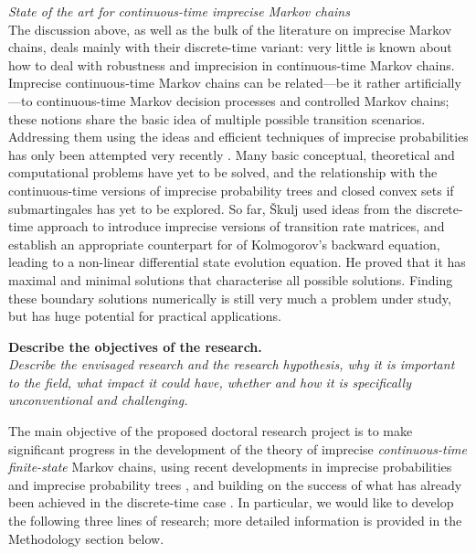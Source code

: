 \documentclass[11pt,dvipsnames,usenames,a4paper]{article}
\begin{document}
\emph{State of the art for continuous-time imprecise Markov chains}\\[5pt]
The discussion above, as well as the bulk of the literature on imprecise Markov chains, deals mainly with their discrete-time variant: very little is known about how to deal with robustness and imprecision in continuous-time Markov chains. 
Imprecise continuous-time Markov chains can be related---be it rather artificially---to continuous-time Markov decision processes and controlled Markov chains; these notions share the basic idea of multiple possible transition scenarios.
Addressing them using the ideas and efficient techniques of imprecise probabilities has only been attempted very recently \cite{skulj2015:continuous:bounds,Troffaes+GSB-ISIPTA15p,DeBock:2016:iCTMClimit}.
Many basic conceptual, theoretical and computational problems have yet to be solved, and the relationship with the continuous-time versions of imprecise probability trees and closed convex sets if submartingales has yet to be explored.
So far, Škulj \cite{skulj2015:continuous:bounds} used  ideas from the discrete-time approach to introduce imprecise versions of transition rate matrices, and establish an appropriate counterpart for of Kolmogorov's backward equation, leading to a non-linear differential state evolution equation. 
He proved that it has maximal and minimal solutions that characterise all possible solutions. Finding these boundary solutions numerically is still very much a problem under study, but has huge potential for practical applications.

\vspace{3mm}

\textbf{Describe the objectives of the research.}\\
\textit{Describe the envisaged research and the research hypothesis, why it is important to the field, what impact it could have, whether and how it is specifically unconventional and challenging.}


The main objective of the proposed doctoral research project is to make significant progress in the development of the theory of imprecise \emph{continuous-time} \emph{finite-state} Markov chains, using recent developments in imprecise probabilities \cite{augustin2013:itip,troffaes2013:lp} and imprecise probability trees \cite{shafer2001,cooman2007d}, and building on the success of what has already been achieved in the discrete-time case \cite{cooman2008,hermans2012,skulj2013,cooman2015:markovergodic}. In particular, we would like to develop the following three lines of research; more detailed information is provided in the Methodology section below.
\end{document}
